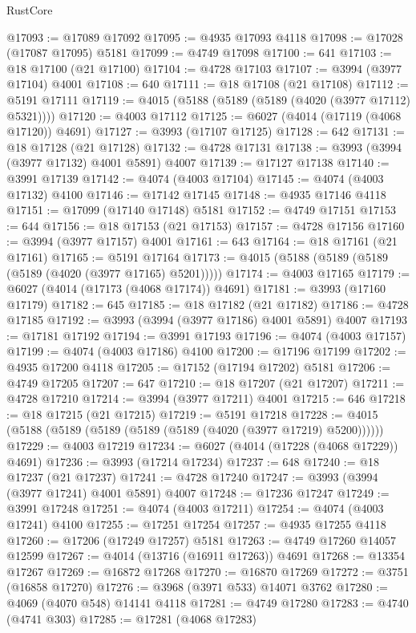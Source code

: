 \begin{lexlean}{RustCore}
\begin{coremodule}
@17093 := @17089 @17092
@17095 := @4935 @17093 @4118
@17098 := @17028 (@17087 @17095) @5181
@17099 := @4749 @17098
@17100 := 641
@17103 := @18 @17100 (@21 @17100)
@17104 := @4728 @17103
@17107 := @3994 (@3977 @17104) @4001
@17108 := 640
@17111 := @18 @17108 (@21 @17108)
@17112 := @5191 @17111
@17119 := @4015 (@5188 (@5189 (@5189 (@4020 (@3977 @17112) @5321))))
@17120 := @4003 @17112
@17125 := @6027 (@4014 (@17119 (@4068 @17120)) @4691)
@17127 := @3993 (@17107 @17125)
@17128 := 642
@17131 := @18 @17128 (@21 @17128)
@17132 := @4728 @17131
@17138 := @3993 (@3994 (@3977 @17132) @4001 @5891) @4007
@17139 := @17127 @17138
@17140 := @3991 @17139
@17142 := @4074 (@4003 @17104)
@17145 := @4074 (@4003 @17132) @4100
@17146 := @17142 @17145
@17148 := @4935 @17146 @4118
@17151 := @17099 (@17140 @17148) @5181
@17152 := @4749 @17151
@17153 := 644
@17156 := @18 @17153 (@21 @17153)
@17157 := @4728 @17156
@17160 := @3994 (@3977 @17157) @4001
@17161 := 643
@17164 := @18 @17161 (@21 @17161)
@17165 := @5191 @17164
@17173 := @4015 (@5188 (@5189 (@5189 (@5189 (@4020 (@3977 @17165) @5201)))))
@17174 := @4003 @17165
@17179 := @6027 (@4014 (@17173 (@4068 @17174)) @4691)
@17181 := @3993 (@17160 @17179)
@17182 := 645
@17185 := @18 @17182 (@21 @17182)
@17186 := @4728 @17185
@17192 := @3993 (@3994 (@3977 @17186) @4001 @5891) @4007
@17193 := @17181 @17192
@17194 := @3991 @17193
@17196 := @4074 (@4003 @17157)
@17199 := @4074 (@4003 @17186) @4100
@17200 := @17196 @17199
@17202 := @4935 @17200 @4118
@17205 := @17152 (@17194 @17202) @5181
@17206 := @4749 @17205
@17207 := 647
@17210 := @18 @17207 (@21 @17207)
@17211 := @4728 @17210
@17214 := @3994 (@3977 @17211) @4001
@17215 := 646
@17218 := @18 @17215 (@21 @17215)
@17219 := @5191 @17218
@17228 := @4015 (@5188 (@5189 (@5189 (@5189 (@5189 (@4020 (@3977 @17219) @5200))))))
@17229 := @4003 @17219
@17234 := @6027 (@4014 (@17228 (@4068 @17229)) @4691)
@17236 := @3993 (@17214 @17234)
@17237 := 648
@17240 := @18 @17237 (@21 @17237)
@17241 := @4728 @17240
@17247 := @3993 (@3994 (@3977 @17241) @4001 @5891) @4007
@17248 := @17236 @17247
@17249 := @3991 @17248
@17251 := @4074 (@4003 @17211)
@17254 := @4074 (@4003 @17241) @4100
@17255 := @17251 @17254
@17257 := @4935 @17255 @4118
@17260 := @17206 (@17249 @17257) @5181
@17263 := @4749 @17260 @14057 @12599
@17267 := @4014 (@13716 (@16911 @17263)) @4691
@17268 := @13354 @17267
@17269 := @16872 @17268
@17270 := @16870 @17269
@17272 := @3751 (@16858 @17270)
@17276 := @3968 (@3971 @533) @14071 @3762
@17280 := @4069 (@4070 @548) @14141 @4118
@17281 := @4749 @17280
@17283 := @4740 (@4741 @303)
@17285 := @17281 (@4068 @17283)

\end{coremodule}
\end{lexlean}
